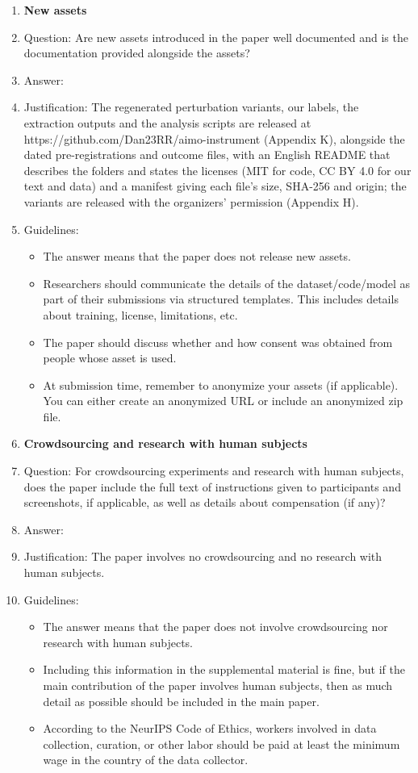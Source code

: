 \begin{enumerate}
\item {\bf New assets}
    \item[] Question: Are new assets introduced in the paper well documented and is the documentation provided alongside the assets?
    \item[] Answer: \answerYes{}
    \item[] Justification: The regenerated perturbation variants, our labels, the extraction outputs and the analysis scripts are released at https://github.com/Dan23RR/aimo-instrument (Appendix K), alongside the dated pre-registrations and outcome files, with an English README that describes the folders and states the licenses (MIT for code, CC BY 4.0 for our text and data) and a manifest giving each file's size, SHA-256 and origin; the variants are released with the organizers' permission (Appendix H).
    \item[] Guidelines:
    \begin{itemize}
        \item The answer \answerNA{} means that the paper does not release new assets.
        \item Researchers should communicate the details of the dataset\slash code\slash model as part of their submissions via structured templates. This includes details about training, license, limitations, etc. 
        \item The paper should discuss whether and how consent was obtained from people whose asset is used.
        \item At submission time, remember to anonymize your assets (if applicable). You can either create an anonymized URL or include an anonymized zip file.
    \end{itemize}

\item {\bf Crowdsourcing and research with human subjects}
    \item[] Question: For crowdsourcing experiments and research with human subjects, does the paper include the full text of instructions given to participants and screenshots, if applicable, as well as details about compensation (if any)? 
    \item[] Answer: \answerNA{}
    \item[] Justification: The paper involves no crowdsourcing and no research with human subjects.
    \item[] Guidelines:
    \begin{itemize}
        \item The answer \answerNA{} means that the paper does not involve crowdsourcing nor research with human subjects.
        \item Including this information in the supplemental material is fine, but if the main contribution of the paper involves human subjects, then as much detail as possible should be included in the main paper. 
        \item According to the NeurIPS Code of Ethics, workers involved in data collection, curation, or other labor should be paid at least the minimum wage in the country of the data collector. 
    \end{itemize}


\end{enumerate}
